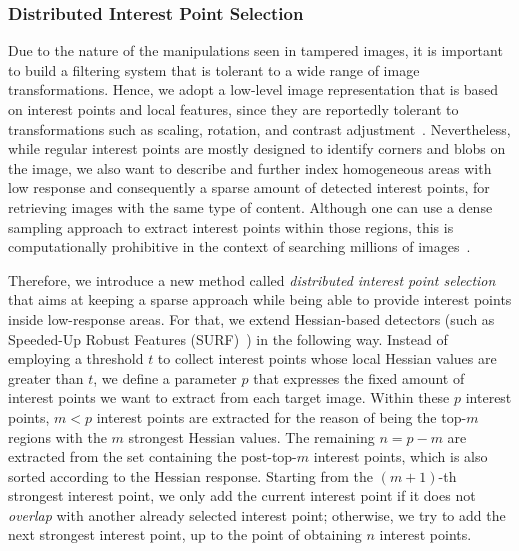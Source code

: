 \vspace{0.2cm} 
\subsubsection{Distributed Interest Point Selection} 
\label{sec:prop_spread_kp}
Due to the nature of the manipulations seen in tampered images, it is important to build a filtering system that is tolerant to a wide range of image transformations.
Hence, we adopt a low-level image representation that is based on interest points and local features, since they are reportedly tolerant to transformations such as scaling, rotation, and contrast adjustment~\cite{Bay:CVIU:2008}.
Nevertheless, while regular interest points are mostly designed to identify corners and blobs on the image, we also want to describe and further index homogeneous areas with low response and consequently a sparse amount of detected interest points, for retrieving images with the same type of content.
Although one can use a dense sampling approach to extract interest points within those regions, this is computationally prohibitive in the context of searching millions of images~\cite{pinto2017filtering}.

Therefore, we introduce a new method called \emph{distributed interest point selection} that aims at keeping a sparse approach while being able to provide interest points inside low-response areas.
For that, we extend Hessian-based detectors (such as Speeded-Up Robust Features (SURF)~\cite{Bay:CVIU:2008}) in the following way.
Instead of employing a threshold $t$ to collect interest points whose local Hessian values are greater than $t$, we define a parameter $p$ that expresses the fixed amount of interest points we want to extract from each target image.
Within these $p$ interest points, $m < p$ interest points are extracted for the reason of being the top-$m$ regions with the $m$ strongest Hessian values.
The remaining $n = p - m$ are extracted from the set containing the post-top-$m$ interest points, which is also sorted according to the Hessian response.
Starting from the $(m+1)$-th strongest interest point, we only add the current interest point if it does not \emph{overlap} with another already selected interest point; otherwise, we try to add the next strongest interest point, up to the point of obtaining $n$ interest points.


